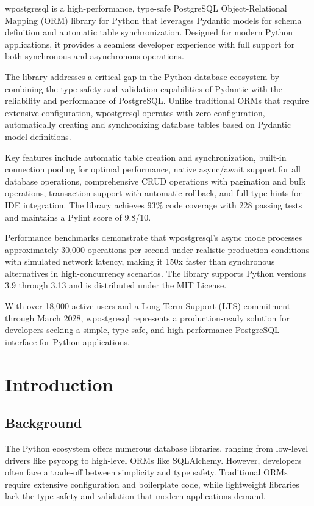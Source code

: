 \documentclass[12pt,a4paper]{report}
\begin{document}
wpostgresql is a high-performance, type-safe PostgreSQL Object-Relational Mapping (ORM) library for Python that leverages Pydantic models for schema definition and automatic table synchronization. Designed for modern Python applications, it provides a seamless developer experience with full support for both synchronous and asynchronous operations.

The library addresses a critical gap in the Python database ecosystem by combining the type safety and validation capabilities of Pydantic with the reliability and performance of PostgreSQL. Unlike traditional ORMs that require extensive configuration, wpostgresql operates with zero configuration, automatically creating and synchronizing database tables based on Pydantic model definitions.

Key features include automatic table creation and synchronization, built-in connection pooling for optimal performance, native async/await support for all database operations, comprehensive CRUD operations with pagination and bulk operations, transaction support with automatic rollback, and full type hints for IDE integration. The library achieves 93\% code coverage with 228 passing tests and maintains a Pylint score of 9.8/10.

Performance benchmarks demonstrate that wpostgresql's async mode processes approximately 30,000 operations per second under realistic production conditions with simulated network latency, making it 150x faster than synchronous alternatives in high-concurrency scenarios. The library supports Python versions 3.9 through 3.13 and is distributed under the MIT License.

With over 18,000 active users and a Long Term Support (LTS) commitment through March 2028, wpostgresql represents a production-ready solution for developers seeking a simple, type-safe, and high-performance PostgreSQL interface for Python applications.

\chapter{Introduction}

\section{Background}

The Python ecosystem offers numerous database libraries, ranging from low-level drivers like psycopg to high-level ORMs like SQLAlchemy. However, developers often face a trade-off between simplicity and type safety. Traditional ORMs require extensive configuration and boilerplate code, while lightweight libraries lack the type safety and validation that modern applications demand.
\end{document}

